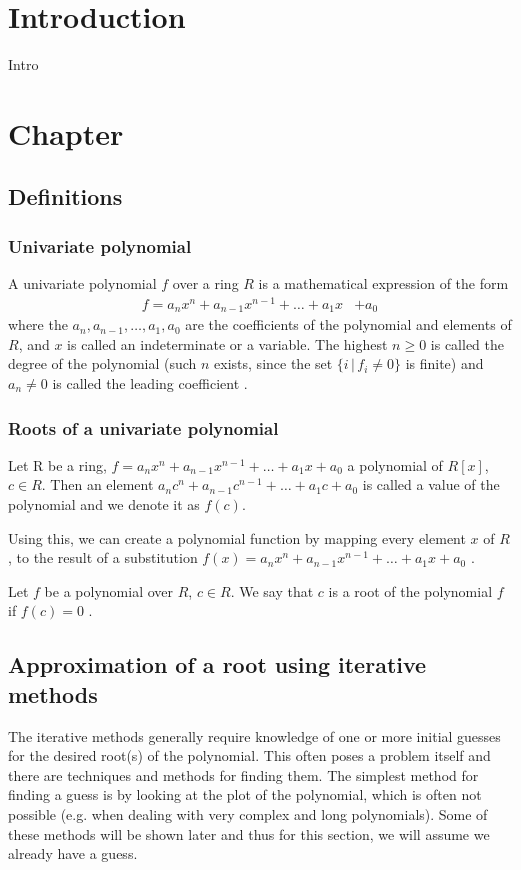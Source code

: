\documentclass[
  digital, %
  table,   %
  nolof,     %
  nolot,     %
	draft, %
]{fithesis3}
\begin{document}
\chapter{Introduction}
Intro

\chapter{Chapter}
\section{Definitions}
\subsection{Univariate polynomial}
A univariate polynomial $f$ over a ring $R$ is a mathematical expression of the form
\begin{align}
       f = a_{n}x^{n}  +  a_{n-1}x^{n-1} +  \ldots  +  a_{1}x  &+  a_{0} \label{eq:polynom}
\end{align}
where the $a_{n}, a_{n-1}, \ldots, a_{1}, a_{0}$  are the coefficients of the polynomial and elements of $R$, and $x$ is called an indeterminate or a variable.  The highest $n \geq 0$ is called the degree of the polynomial (such $n$ exists, since the set $\{i \, | \, f_{i} \neq 0 \}$ is finite) and $a_{n} \neq 0$ is called the leading coefficient \parencite{rosicky07}. 

\subsection{Roots of a univariate polynomial}
Let R be a ring, $f = a_{n}x^{n}  +  a_{n-1}x^{n-1} +  \ldots  +  a_{1}x  +  a_{0}$ a polynomial of $R[x]$, $c \in R$. Then an element $a_{n}c^{n}  +  a_{n-1}c^{n-1} +  \ldots  +  a_{1}c  +  a_{0}$ is called a value of the polynomial and we denote it as $f(c)$.

Using this, we can create a polynomial function by mapping every element $x$ of $R$, to the result of a substitution $f(x) = a_{n}x^{n}  +  a_{n-1}x^{n-1} +  \ldots  +  a_{1}x  +  a_{0}$ \parencite{polynomialsChina}.

Let $f$ be a polynomial over $R$, $c \in R$. We say that $c$ is a root of the polynomial $f$ if $f(c) = 0$ \parencite{rosicky07}.

\section{Approximation of a root using iterative methods}
The iterative methods generally require knowledge of one or more initial guesses for the desired root(s) of the polynomial. This often poses a problem itself and there are techniques and methods for finding them. The simplest method for finding a guess is by looking at the plot of the polynomial, which is often not possible (e.g. when dealing with very complex and long polynomials). Some of these methods will be shown later and thus for this section, we will assume we already have a guess.
\end{document}
